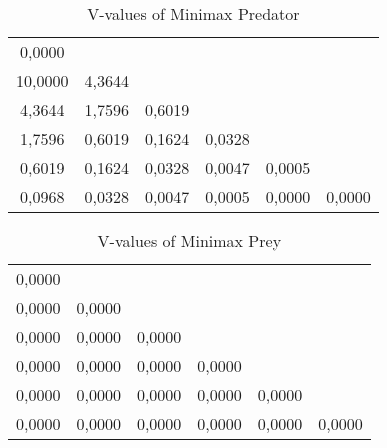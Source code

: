 \begin{table}[htb]
\centering
\begin{tabular}{cccccc}
0,0000 &  &  &  &  & \\
10,0000 & 4,3644 &  &  &  & \\ 
4,3644 & 1,7596 & 0,6019 &  &  & \\
1,7596 & 0,6019 & 0,1624 & 0,0328 &  & \\ 
0,6019 & 0,1624 & 0,0328 & 0,0047 & 0,0005 & \\ 
0,0968 & 0,0328 & 0,0047 & 0,0005 & 0,0000 & 0,0000\\ 
\end{tabular}
\caption{V-values of Minimax Predator}
\label{tab:predM}
\end{table}

\begin{table}[htb]
\centering
\begin{tabular}{cccccc}
0,0000 &  &  &  &  & \\ 
0,0000 & 0,0000 &  &  &  & \\ 
0,0000 & 0,0000 & 0,0000 &  &  & \\ 
0,0000 & 0,0000 & 0,0000 & 0,0000 &  & \\ 
0,0000 & 0,0000 & 0,0000 & 0,0000 & 0,0000 & \\ 
0,0000 & 0,0000 & 0,0000 & 0,0000 & 0,0000 & 0,0000\\ 
\end{tabular}
\caption{V-values of Minimax Prey}
\label{tab:preyM}
\end{table}


\FloatBarrier